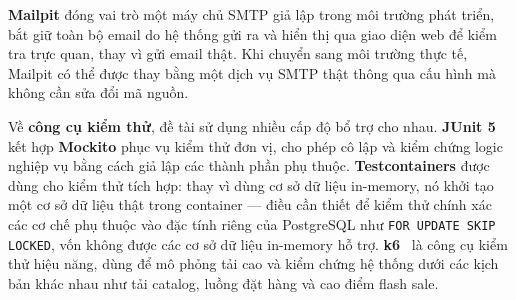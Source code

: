 \documentclass[../DoAn.tex]{subfiles}
\begin{document}
\textbf{Mailpit} đóng vai trò một máy chủ SMTP giả lập trong môi trường phát triển, bắt giữ
toàn bộ email do hệ thống gửi ra và hiển thị qua giao diện web để kiểm tra trực quan, thay vì
gửi email thật. Khi chuyển sang môi trường thực tế, Mailpit có thể được thay bằng một dịch vụ
SMTP thật thông qua cấu hình mà không cần sửa đổi mã nguồn.

Về \textbf{công cụ kiểm thử}, đề tài sử dụng nhiều cấp độ bổ trợ cho nhau. \textbf{JUnit 5}
kết hợp \textbf{Mockito} phục vụ kiểm thử đơn vị, cho phép cô lập và kiểm chứng logic nghiệp
vụ bằng cách giả lập các thành phần phụ thuộc. \textbf{Testcontainers} được dùng cho kiểm thử
tích hợp: thay vì dùng cơ sở dữ liệu in-memory, nó khởi tạo một cơ sở dữ liệu thật trong
container --- điều cần thiết để kiểm thử chính xác các cơ chế phụ thuộc vào đặc tính riêng của
PostgreSQL như \texttt{FOR UPDATE SKIP LOCKED}, vốn không được các cơ sở dữ liệu in-memory hỗ
trợ. \textbf{k6}~\cite{k6_docs} là công cụ kiểm thử hiệu năng, dùng để mô phỏng tải cao và
kiểm chứng hệ thống dưới các kịch bản khác nhau như tải catalog, luồng đặt hàng và cao điểm
flash sale. 
\end{document}
